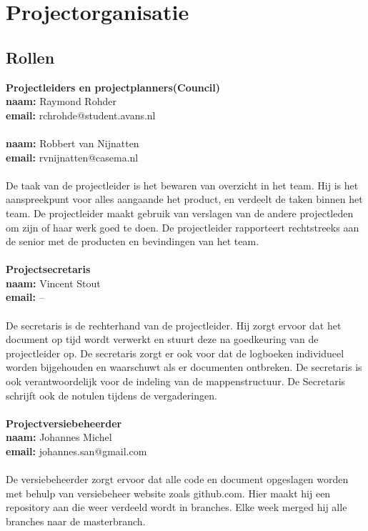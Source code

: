 \chapter{Projectorganisatie} \label{cha:your-first-document}


\section{Rollen} \label{sec:basics}

\textbf{Projectleiders en projectplanners(Council)}\\
\textbf{naam:}	Raymond Rohder\\
\textbf{email:}	rchrohde@student.avans.nl\\
\\
\textbf{naam:}	Robbert van Nijnatten\\
\textbf{email:}	rvnijnatten@casema.nl\\
\\
De taak van de projectleider is het bewaren van overzicht in het team. Hij is het aanspreekpunt voor alles aangaande het product, en verdeelt de taken binnen het team. De projectleider maakt gebruik van verslagen van de andere projectleden om zijn of haar werk goed te doen. De projectleider rapporteert rechtstreeks aan de senior met de producten en bevindingen van het team.\\
\\
\textbf{Projectsecretaris}\\
\textbf{naam:}	Vincent Stout\\
\textbf{email:}	--\\
\\
De secretaris is de rechterhand van de projectleider. Hij zorgt ervoor dat het document op tijd wordt verwerkt en stuurt deze na goedkeuring van de projectleider op. De secretaris zorgt er ook voor dat de logboeken individueel worden bijgehouden en waarschuwt als er documenten ontbreken. De secretaris is ook verantwoordelijk voor de indeling van de mappenstructuur.
De Secretaris schrijft ook de notulen tijdens de vergaderingen.\\
\\
\textbf{Projectversiebeheerder}\\
\textbf{naam:}	Johannes Michel\\
\textbf{email:}	johannes.san@gmail.com\\
\\
De versiebeheerder zorgt ervoor dat alle code en document opgeslagen worden met behulp van versiebeheer website zoals github.com. Hier maakt hij een repository aan die weer verdeeld wordt in branches. Elke week merged hij alle branches naar de masterbranch.\\
